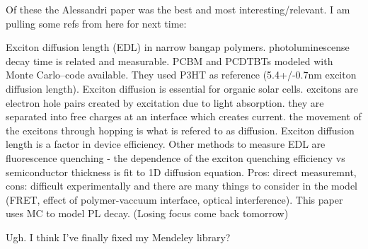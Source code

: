 \documentclass{article}
\begin{document}
Of these the Alessandri paper was the best and  most interesting/relevant. I am pulling some refs from here for next time:

\cite{Mikhnenko2012}

Exciton diffusion length (EDL) in narrow bangap polymers. photoluminescense decay time is related and measurable. PCBM and PCDTBTs modeled with Monte Carlo--code available. They used P3HT as reference (5.4+/-0.7nm exciton diffusion length). 
Exciton diffusion is essential for organic solar cells. excitons are electron hole pairs created by excitation due to light absorption. they are separated into free charges at an interface which creates current. the movement of the excitons through hopping is what is refered to as diffusion. Exciton diffusion length is a factor in device efficiency.
Other methods to measure EDL are fluorescence quenching - the dependence of the exciton quenching efficiency vs semiconductor thickness is fit to 1D diffusion equation. Pros: direct measuremnt, cons: difficult experimentally and there are many things to consider in the model (FRET, effect of polymer-vaccuum interface, optical interference). 
This paper uses MC to model PL decay.
(Losing focus come back tomorrow)


Ugh. I think I've finally fixed my Mendeley library?

\cite{Scharber2013}
\end{document}
